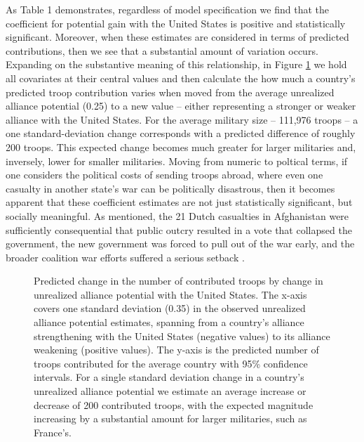 \documentclass[12pt,letterpaper]{article}
\begin{document}
		As Table 1 demonstrates, regardless of model specification we find that the coefficient for potential gain with the United States is positive and statistically significant. Moreover, when these estimates are considered in terms of predicted contributions, then we see that a substantial amount of variation occurs. 
		Expanding on the substantive meaning of this relationship, in Figure \ref{fig:predict} we hold all covariates at their central values and then calculate the how much a country's predicted troop contribution varies when moved from the average unrealized alliance potential (0.25) to a new value -- either representing a stronger or weaker alliance with the United States.
		For the average military size -- 111,976 troops -- a one standard-deviation change corresponds with a predicted difference of roughly 200 troops.
		This expected change becomes much greater for larger militaries and, inversely, lower for smaller militaries. 
		Moving from numeric to poltical terms, if one considers the political costs of sending troops abroad, where even one casualty in another state's war can be politically disastrous, then it becomes apparent that these coefficient estimates are not just statistically significant, but socially meaningful. As mentioned, the 21 Dutch casualties in Afghanistan were sufficiently consequential that public outcry resulted in a vote that collapsed the government, the new government was forced to pull out of the war early, and the broader coalition war efforts suffered a serious setback \citep[95-100]{massie_whydemocraticallies_2016}.

		\newpage
		\begin{figure}[ht]
			\centering
			\resizebox{1.05\linewidth}{!}{
				
			}
			\caption{Predicted change in the number of contributed troops by change in unrealized alliance potential with the United States.
			The x-axis covers one standard deviation (0.35) in the observed unrealized alliance potential estimates, spanning from a country's alliance strengthening with the United States (negative values) to its alliance weakening (positive values). 
			The y-axis is the predicted number of troops contributed for the average country with 95\% confidence intervals.
			For a single standard deviation change in a country's unrealized alliance potential we estimate an average increase or decrease of 200 contributed troops, with the expected magnitude increasing by a substantial amount for larger militaries, such as France's.}
			\label{fig:predict}
		\end{figure}
		\newpage
\end{document}
